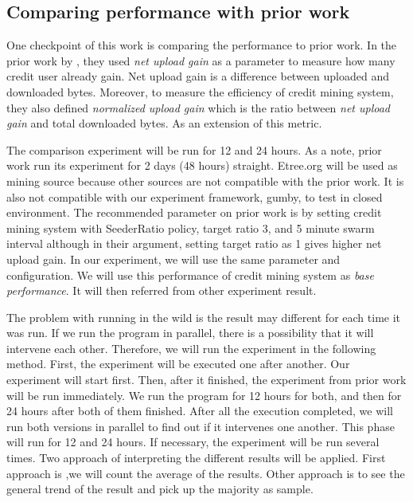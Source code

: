 \subsection{Comparing performance with prior work}
One checkpoint of this work is comparing the performance to prior work. In the prior work by \citeauthor{2015:creditmining:capota}, they used \textit{net upload gain} as a parameter to measure how many credit user already gain. Net upload gain is a difference between uploaded and downloaded bytes. Moreover, to measure the efficiency of credit mining system, they also defined \textit{normalized upload gain} which is the ratio between \textit{net upload gain} and total downloaded bytes. As an extension of this metric. 

The comparison experiment will be run for 12 and 24 hours. As a note, prior work run its experiment for 2 days (48 hours) straight. Etree.org will be used as mining source because other sources are not compatible with the prior work. It is also not compatible with our experiment framework, gumby, to test in closed environment. The recommended parameter on prior work is by setting credit mining system with SeederRatio policy, target ratio 3, and 5 minute swarm interval although in their argument, setting target ratio as 1 gives higher net upload gain. In our experiment, we will use the same parameter and configuration. We will use this performance of credit mining system as \textit{base performance}. It will then referred from other experiment result. 

The problem with running in the wild is the result may different for each time it was run. If we run the program in parallel, there is a possibility that it will intervene each other. Therefore, we will run the experiment in the following method. First, the experiment will be executed one after another. Our experiment will start first. Then, after it finished, the experiment from prior work will be run immediately. We run the program for 12 hours for both, and then for 24 hours after both of them finished. After all the execution completed, we will run both versions in parallel to find out if it intervenes one another. This phase will run for 12 and 24 hours. If necessary, the experiment will be run several times. Two approach of interpreting the different results will be applied. First approach is ,we will count the average of the results. Other approach is to see the general trend of the result and pick up the majority as sample. 

